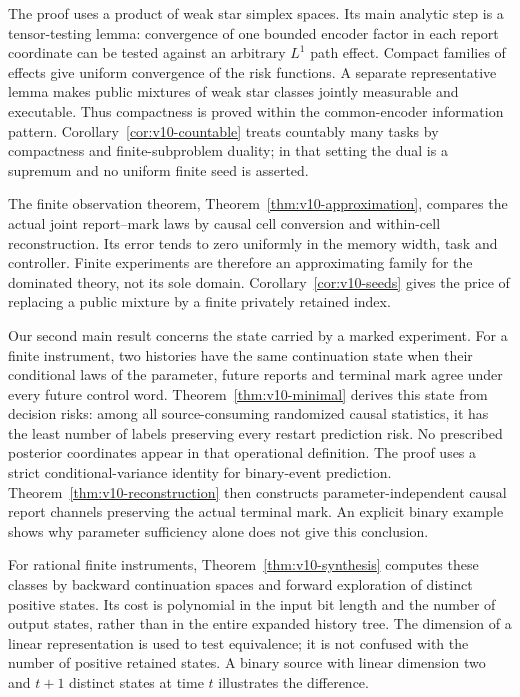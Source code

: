 The proof uses a product of weak star simplex spaces. Its main analytic
step is a tensor-testing lemma: convergence of one bounded encoder
factor in each report coordinate can be tested against an arbitrary
$L^1$ path effect. Compact families of effects give uniform convergence
of the risk functions. A separate representative lemma makes public
mixtures of weak star classes jointly measurable and executable.
Thus compactness is proved within the common-encoder information
pattern. Corollary~\ref{cor:v10-countable} treats countably many tasks
by compactness and finite-subproblem duality; in that setting the dual
is a supremum and no uniform finite seed is asserted.

The finite observation theorem, Theorem~\ref{thm:v10-approximation},
compares the actual joint report--mark laws by causal cell conversion
and within-cell reconstruction. Its error tends to zero uniformly
in the memory width, task and controller. Finite experiments are
therefore an approximating family for the dominated theory, not its
sole domain. Corollary~\ref{cor:v10-seeds} gives the price of replacing
a public mixture by a finite privately retained index.

Our second main result concerns the state carried by a marked
experiment. For a finite instrument, two histories have the same
continuation state when their conditional laws of the parameter,
future reports and terminal mark agree under every future control
word. Theorem~\ref{thm:v10-minimal} derives this state from decision
risks: among all source-consuming randomized causal statistics, it
has the least number of labels preserving every restart prediction
risk. No prescribed posterior coordinates appear in that operational
definition. The proof uses a strict conditional-variance identity for
binary-event prediction. Theorem~\ref{thm:v10-reconstruction} then
constructs parameter-independent causal report channels preserving
the actual terminal mark. An explicit binary example shows why
parameter sufficiency alone does not give this conclusion.

For rational finite instruments, Theorem~\ref{thm:v10-synthesis}
computes these classes by backward continuation spaces and forward
exploration of distinct positive states. Its cost is polynomial in
the input bit length and the number of output states, rather than in
the entire expanded history tree. The dimension of a linear
representation is used to test equivalence; it is not confused with
the number of positive retained states. A binary source with linear
dimension two and $t+1$ distinct states at time $t$ illustrates the
difference.

